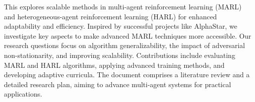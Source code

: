 This \printdoctype explores scalable methods in multi-agent reinforcement learning (MARL) 
and heterogeneous-agent reinforcement learning (HARL) for enhanced adaptability and efficiency. 
Inspired by successful projects like AlphaStar, we investigate key aspects to make advanced MARL 
techniques more accessible. Our research questions focus on algorithm generalizability, 
the impact of adversarial non-stationarity, and improving scalability. 
Contributions include evaluating MARL and HARL algorithms, applying advanced training methods, 
and developing adaptive curricula. The document comprises a literature review and a 
detailed research plan, aiming to advance multi-agent systems for practical applications.